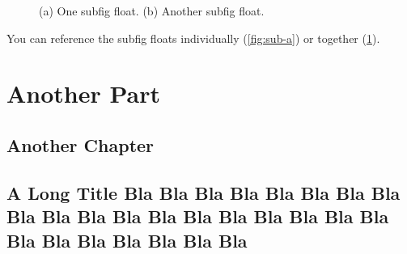 \begin{figure}
  \begin{center}
    \caption{(a) One subfig float. (b) Another subfig float.%
      \label{fig:both}}
  \end{center}
\end{figure}
You can reference the subfig floats individually (\ref{fig:sub-a}) or
together (\ref{fig:both}).

\Blindtext[3]

\part{Another Part}
\chapter{Another Chapter}
\Blindtext[5]
\chapter{A Long Title Bla Bla Bla Bla Bla Bla Bla Bla Bla Bla Bla
Bla Bla Bla Bla Bla Bla Bla Bla Bla Bla Bla Bla Bla Bla Bla}
\Blindtext[5]
\endinput
